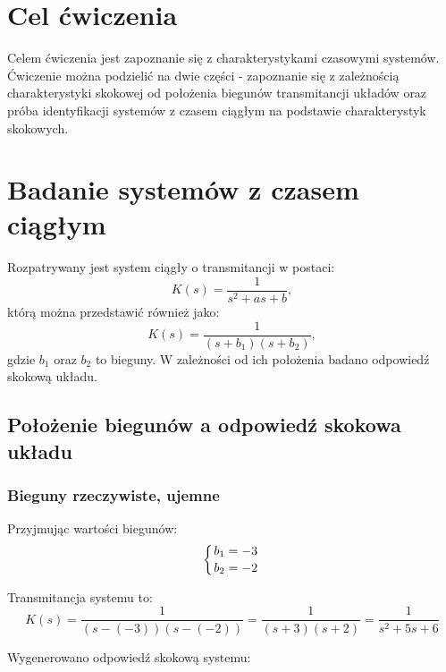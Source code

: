 \documentclass[12pt]{article}
\begin{document}

\tableofcontents
\newpage

\section{Cel ćwiczenia}
Celem ćwiczenia jest zapoznanie się z charakterystykami czasowymi systemów. Ćwiczenie można podzielić na dwie części - zapoznanie się z zależnością charakterystyki skokowej od położenia biegunów transmitancji układów oraz próba identyfikacji systemów z czasem ciągłym na podstawie charakterystyk skokowych.


\section{Badanie systemów z czasem ciągłym}

Rozpatrywany jest system ciągły o transmitancji w postaci:
\begin{equation}
    K(s) = \frac{1}{s^2+as+b},
\end{equation}
którą można przedstawić również jako:
\begin{equation}
    K(s) = \frac{1}{(s+b_1)(s+b_2)},
\end{equation}
gdzie $b_1$ oraz $b_2$ to bieguny. W zależności od ich położenia badano odpowiedź skokową układu.

\subsection{Położenie biegunów a odpowiedź skokowa układu}

\subsubsection{Bieguny rzeczywiste, ujemne}
Przyjmując wartości biegunów:
\begin{equation*}
    \left\{{{b_1 = -3}\atop {b_2 = -2}}\right.
\end{equation*}

Transmitancja systemu to:
\begin{equation}
    K(s) = \frac{1}{(s-(-3))(s-(-2))} = \frac{1}{(s+3)(s+2)} = \frac{1}{s^2+5s+6}
\end{equation}

Wygenerowano odpowiedź skokową systemu:
\end{document}
